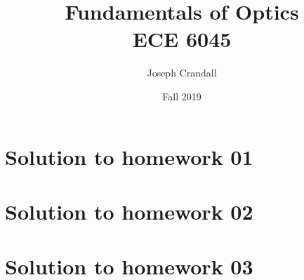 

\usepackage{subfiles}
\usepackage{color,soul}
\usepackage{siunitx}
\usepackage{gensymb}

\title{Fundamentals of Optics\\
\large ECE 6045}
\author{Joseph Crandall}
\date{Fall 2019}


\maketitle

\section{Solution to homework 01}


\section{Solution to homework 02}


\section{Solution to homework 03}


%

%

%


